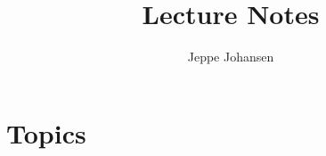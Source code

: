 \documentclass[a4paper,12pt]{article}
\title{Lecture Notes}
\author{Jeppe Johansen}
\newcommand{\1}{\mathbbm{1}}
\begin{document}
\tableofcontents



\maketitle

\section{Topics}

\iffalse














%

\fi

\iffalse
\section{Lectures}





















\fi



\end{document}
